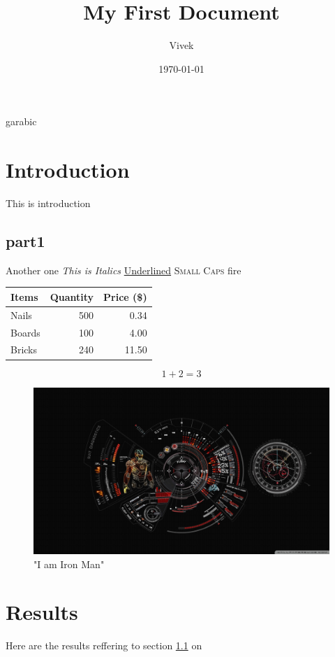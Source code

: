 \documentclass[a4paper,12pt]{article}
\begin{document}
\title{My First Document}
\author{Vivek}
\date{\today}
\maketitle

\tableofcontents
\newpage
\pagenumberin	g{arabic}

\section{Introduction}
This is introduction

\subsection{part1}
\label{sec1}
Another one
\textit{This is Italics}
\underline{Underlined}
\textsc{Small Caps}
{\color{red}fire}
\\


\begin{tabular}{|l|r|r|}
\hline
Items & Quantity & Price (\$)\\
\hline
Nails & 500 & 0.34\\
Boards & 100 & 4.00\\
Bricks & 240 & 11.50\\
\hline

\end{tabular}

$$ 1 + 2 = 3 $$

\begin{figure}[t]
\centering
\includegraphics[scale=0.2]{1.jpg}
\caption{"I am Iron Man"}
\label{image1}
\end{figure}

\section{Results}
Here are the results reffering to section \ref{sec1} on \pageref{sec1}
\end{document}

